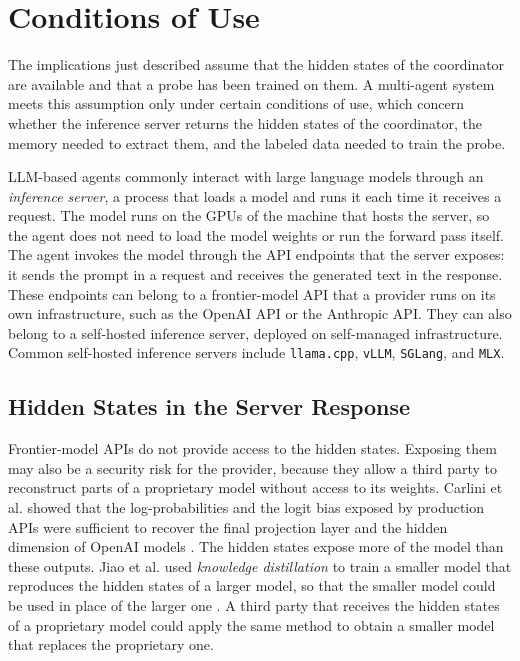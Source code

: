 \section{Conditions of Use}
\label{sec:ch9-conditions}

The implications just described assume that the hidden states of the coordinator are available and that a probe has been trained on them. A multi-agent system meets this assumption only under certain conditions of use, which concern whether the inference server returns the hidden states of the coordinator, the memory needed to extract them, and the labeled data needed to train the probe.

LLM-based agents commonly interact with large language models through an \emph{inference server}, a process that loads a model and runs it each time it receives a request. The model runs on the GPUs of the machine that hosts the server, so the agent does not need to load the model weights or run the forward pass itself. The agent invokes the model through the API endpoints that the server exposes: it sends the prompt in a request and receives the generated text in the response. These endpoints can belong to a frontier-model API that a provider runs on its own infrastructure, such as the OpenAI API or the Anthropic API. They can also belong to a self-hosted inference server, deployed on self-managed infrastructure. Common self-hosted inference servers include \texttt{llama.cpp}, \texttt{vLLM}, \texttt{SGLang}, and \texttt{MLX}.

\subsection{Hidden States in the Server Response}
\label{subsec:ch9-flag-access}

Frontier-model APIs do not provide access to the hidden states. Exposing them may also be a security risk for the provider, because they allow a third party to reconstruct parts of a proprietary model without access to its weights. Carlini et al. showed that the log-probabilities and the logit bias exposed by production APIs were sufficient to recover the final projection layer and the hidden dimension of OpenAI models \cite{carliniStealingPartProduction2024}. The hidden states expose more of the model than these outputs. Jiao et al. used \emph{knowledge distillation} to train a smaller model that reproduces the hidden states of a larger model, so that the smaller model could be used in place of the larger one \cite{jiaoTinyBERTDistillingBERT2020}. A third party that receives the hidden states of a proprietary model could apply the same method to obtain a smaller model that replaces the proprietary one.

